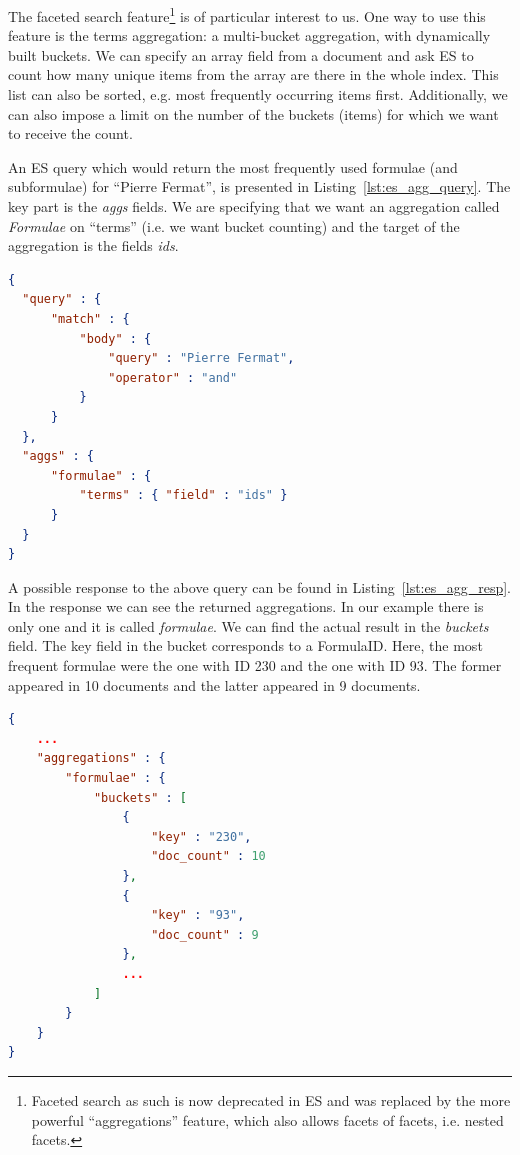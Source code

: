 \documentclass[a4paper,oneside]{article}
\begin{document}
The faceted search feature\footnote{Faceted search as such is now deprecated in
    ES and was replaced by the more powerful ``aggregations'' feature, which
    also allows facets of facets, i.e. nested facets.} is of
particular interest to us. 
One way to use this feature is the terms aggregation: a multi-bucket
aggregation, with dynamically built buckets.  We can specify an array field
from a document and ask ES to count how many unique items from the array are
there in the whole index.  This list can also be sorted, e.g. most frequently
occurring items first.  Additionally, we can also impose a limit on the number
of the buckets (items) for which we want to receive the count.

An ES query which would return the most frequently used formulae (and
subformulae) for ``Pierre Fermat'', is presented in
Listing~\ref{lst:es_agg_query}. The key part is the \emph{aggs} fields. We are
specifying that we want an aggregation called \textit{Formulae} on ``terms''
(i.e. we want bucket counting) and the target of the aggregation is the fields
\emph{ids}.

\begin{lstlisting}[language=json,firstnumber=1,caption=Elastic Search Term
Aggregation Query, captionpos=b, label=lst:es_agg_query]
{
  "query" : {
      "match" : {
          "body" : {
              "query" : "Pierre Fermat",
              "operator" : "and"
          }
      }
  },
  "aggs" : {
      "formulae" : {
          "terms" : { "field" : "ids" }
      }
  }
}
\end{lstlisting}

A possible response to the above query can be found in
Listing~\ref{lst:es_agg_resp}. In the response we can see the returned
aggregations. In our example there is only one and it is called
\emph{formulae}. We can find the actual result in the \emph{buckets} field. The
\textsf{key} field in the bucket corresponds to a \textsf{FormulaID}.
Here, the most frequent formulae were the one with ID 230 and the one with ID
93. The former appeared in 10 documents and the latter appeared in 9 documents.

\begin{lstlisting}[language=json,firstnumber=1,caption=Elastic Search Term
Aggregation Response, captionpos=b, label=lst:es_agg_resp]
{
    ...
    "aggregations" : {
        "formulae" : {
            "buckets" : [
                {
                    "key" : "230",
                    "doc_count" : 10
                },
                {
                    "key" : "93",
                    "doc_count" : 9
                },
                ...
            ]
        }
    }
}
\end{lstlisting}
\end{document}
